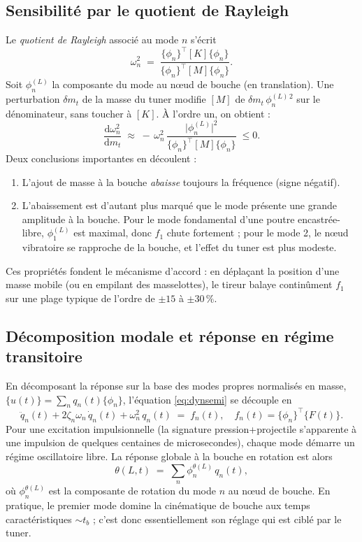 \documentclass[12pt,a4paper]{article}
\begin{document}
	\subsection{Sensibilité par le quotient de Rayleigh}
	\label{sec:rayleigh}

	Le \emph{quotient de Rayleigh} associé au mode $n$ s'écrit
	\begin{equation}
		\omega_n^2 \;=\; \frac{\{\phi_n\}^{\!\top}[K]\{\phi_n\}}{\{\phi_n\}^{\!\top}[M]\{\phi_n\}}.
	\end{equation}
	Soit $\phi_n^{(L)}$ la composante du mode au n\oe ud de bouche (en translation). Une perturbation $\delta m_t$ de la masse du tuner modifie $[M]$ de $\delta m_t\,\phi_n^{(L)\,2}$ sur le dénominateur, sans toucher à $[K]$. À l'ordre un, on obtient :
	\begin{equation}
		\label{eq:dwdmt}
		\boxed{\;\frac{\mathrm{d}\omega_n^2}{\mathrm{d}m_t} \;\approx\; -\,\omega_n^2\,\frac{\big|\phi_n^{(L)}\big|^2}{\{\phi_n\}^{\!\top}[M]\{\phi_n\}}\;\le 0.\;}
	\end{equation}
	Deux conclusions importantes en découlent :
	\begin{enumerate}
		\item L'ajout de masse à la bouche \emph{abaisse} toujours la fréquence (signe négatif).
		\item L'abaissement est d'autant plus marqué que le mode présente une grande amplitude à la bouche. Pour le mode fondamental d'une poutre encastrée-libre, $\phi_1^{(L)}$ est maximal, donc $f_1$ chute fortement ; pour le mode 2, le n\oe ud vibratoire se rapproche de la bouche, et l'effet du tuner est plus modeste.
	\end{enumerate}
	Ces propriétés fondent le mécanisme d'accord : en déplaçant la position d'une masse mobile (ou en empilant des masselottes), le tireur balaye continûment $f_1$ sur une plage typique de l'ordre de $\pm 15$ à $\pm 30\,\%$.

	\subsection{Décomposition modale et réponse en régime transitoire}

	En décomposant la réponse sur la base des modes propres normalisés en masse, $\{u(t)\} = \sum_n q_n(t)\{\phi_n\}$, l'équation \eqref{eq:dynsemi} se découple en
	\begin{equation}
		\ddot q_n(t) + 2\zeta_n \omega_n\, \dot q_n(t) + \omega_n^2\, q_n(t) \;=\; f_n(t),\quad f_n(t) = \{\phi_n\}^{\!\top}\{F(t)\}.
	\end{equation}
	Pour une excitation impulsionnelle (la signature pression+projectile s'apparente à une impulsion de quelques centaines de microsecondes), chaque mode démarre un régime oscillatoire libre. La réponse globale à la bouche en rotation est alors
	\begin{equation}
		\theta(L,t) \;=\; \sum_n \phi_n^{\theta(L)}\, q_n(t),
	\end{equation}
	où $\phi_n^{\theta(L)}$ est la composante de rotation du mode $n$ au n\oe ud de bouche. En pratique, le premier mode domine la cinématique de bouche aux temps caractéristiques $\sim t_b$ ; c'est donc essentiellement son réglage qui est ciblé par le tuner.
\end{document}
